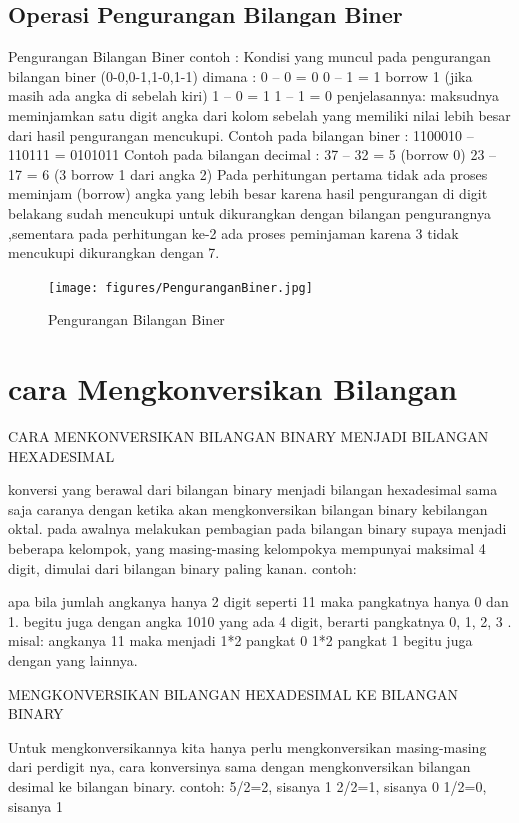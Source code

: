 \subsection {Operasi Pengurangan Bilangan Biner}	
	Pengurangan Bilangan Biner
	contoh :
Kondisi yang muncul pada pengurangan bilangan biner (0-0,0-1,1-0,1-1) dimana :
0 – 0 = 0
0 – 1 = 1 borrow 1 (jika masih ada angka di sebelah kiri)
1 – 0 = 1
1 – 1 = 0
penjelasannya: maksudnya meminjamkan satu digit angka dari kolom sebelah yang memiliki nilai lebih besar dari hasil pengurangan mencukupi.
Contoh pada bilangan biner :
1100010 – 110111 = 0101011 
Contoh pada bilangan decimal :
37 – 32 = 5 (borrow 0)
23 – 17 = 6 (3 borrow 1 dari angka 2)
Pada perhitungan pertama tidak ada proses meminjam (borrow) angka yang lebih besar karena hasil pengurangan di digit belakang sudah mencukupi untuk dikurangkan dengan bilangan pengurangnya ,sementara pada perhitungan ke-2 ada proses peminjaman karena 3 tidak mencukupi dikurangkan dengan 7.

\begin{figure}[ht]
\centerline{\texttt{[image: figures/PenguranganBiner.jpg]}}
\caption{Pengurangan Bilangan Biner}
\label{BilanganBiner}
\end {figure}

\section {cara Mengkonversikan Bilangan}
 CARA MENKONVERSIKAN BILANGAN BINARY MENJADI BILANGAN HEXADESIMAL
 
 konversi yang berawal dari bilangan binary menjadi bilangan hexadesimal sama saja caranya dengan ketika akan mengkonversikan bilangan binary kebilangan oktal. pada awalnya melakukan pembagian pada bilangan binary supaya menjadi beberapa kelompok, yang masing-masing kelompokya mempunyai maksimal 4 digit, dimulai dari bilangan binary paling kanan.
contoh:
 
apa bila jumlah angkanya hanya 2 digit seperti 11 maka pangkatnya hanya 0 dan 1. begitu juga dengan angka 1010 yang ada 4 digit, berarti pangkatnya 0, 1, 2, 3 . 
misal: angkanya 11 maka menjadi
		1*2 pangkat 0
		1*2 pangkat 1
		begitu juga dengan yang lainnya.


MENGKONVERSIKAN BILANGAN HEXADESIMAL KE BILANGAN BINARY

Untuk mengkonversikannya kita hanya perlu mengkonversikan masing-masing dari perdigit nya, cara konversinya sama dengan mengkonversikan bilangan desimal ke bilangan binary.
contoh: 
	5/2=2, sisanya 1
	2/2=1, sisanya 0
	1/2=0, sisanya 1
	
